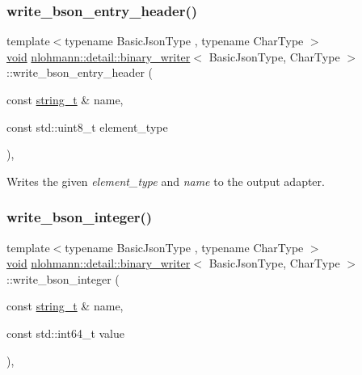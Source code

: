 \subsubsection{\texorpdfstring{write\+\_\+bson\+\_\+entry\+\_\+header()}{write\_bson\_entry\_header()}}
{\footnotesize\ttfamily template$<$typename Basic\+Json\+Type , typename Char\+Type $>$ \\
\hyperlink{namespacenlohmann_1_1detail_a59fca69799f6b9e366710cb9043aa77d}{void} \hyperlink{classnlohmann_1_1detail_1_1binary__writer}{nlohmann\+::detail\+::binary\+\_\+writer}$<$ Basic\+Json\+Type, Char\+Type $>$\+::write\+\_\+bson\+\_\+entry\+\_\+header (\begin{DoxyParamCaption}\item[{const \hyperlink{classnlohmann_1_1detail_1_1binary__writer_a29f2ae7a5c4a8c1dae47b3b2310de8a8}{string\+\_\+t} \&}]{name,  }\item[{const std\+::uint8\+\_\+t}]{element\+\_\+type }\end{DoxyParamCaption})\hspace{0.3cm}{\ttfamily [inline]}, {\ttfamily [private]}}



Writes the given {\itshape element\+\_\+type} and {\itshape name} to the output adapter. 

\mbox{\label{classnlohmann_1_1detail_1_1binary__writer_a553ad4dbdf27238eef90867e4bf2f3e5}} 
\subsubsection{\texorpdfstring{write\+\_\+bson\+\_\+integer()}{write\_bson\_integer()}}
{\footnotesize\ttfamily template$<$typename Basic\+Json\+Type , typename Char\+Type $>$ \\
\hyperlink{namespacenlohmann_1_1detail_a59fca69799f6b9e366710cb9043aa77d}{void} \hyperlink{classnlohmann_1_1detail_1_1binary__writer}{nlohmann\+::detail\+::binary\+\_\+writer}$<$ Basic\+Json\+Type, Char\+Type $>$\+::write\+\_\+bson\+\_\+integer (\begin{DoxyParamCaption}\item[{const \hyperlink{classnlohmann_1_1detail_1_1binary__writer_a29f2ae7a5c4a8c1dae47b3b2310de8a8}{string\+\_\+t} \&}]{name,  }\item[{const std\+::int64\+\_\+t}]{value }\end{DoxyParamCaption})\hspace{0.3cm}{\ttfamily [inline]}, {\ttfamily [private]}}



